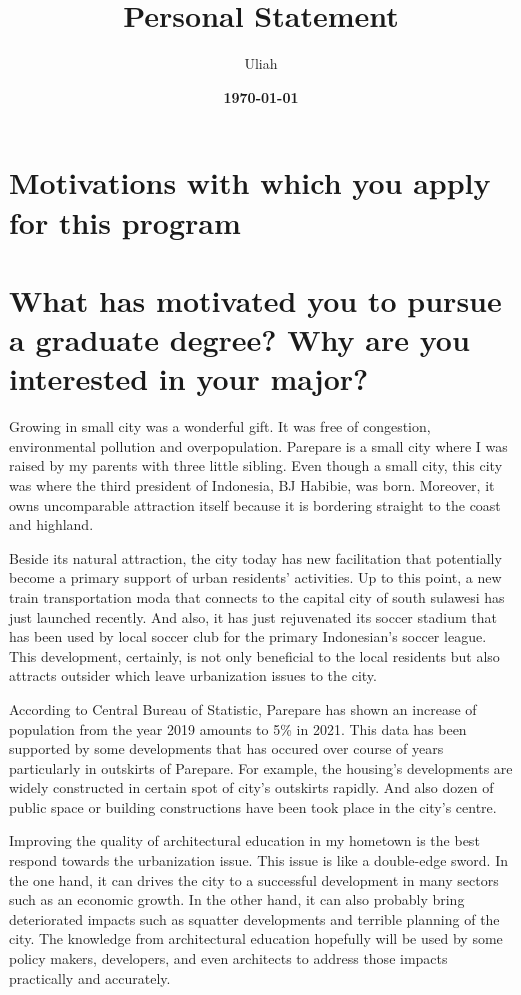 \documentclass[11pt]{simart} %
\title{
\textbf{Personal Statement} \\
} %
\date{\textbf{\today}}
\author{Uliah}
\begin{document}
\maketitle %

\section{Motivations with which you apply for this program}
\section*{What has motivated you to pursue a graduate degree? Why are you interested in your major?}

Growing in small city was a wonderful gift. It was free of congestion, environmental pollution and overpopulation. Parepare is a small city where I was raised by my parents with three little sibling. Even though a small city, this city was where the third president of Indonesia, BJ Habibie, was born.
Moreover, it owns uncomparable attraction itself because it is bordering straight to the coast and highland.

Beside its natural attraction, the city today has new facilitation that potentially become a primary support of urban residents' activities.
Up to this point, a new train transportation moda that connects to the capital city of south sulawesi has just launched recently.
And also, it has just rejuvenated its soccer stadium that has been used by local soccer club for the primary Indonesian's soccer league.
This development, certainly, is not only beneficial to the local residents but also attracts outsider which leave urbanization issues to the city.

According to Central Bureau of Statistic, Parepare has shown an increase of population from the year 2019 amounts to 5\% in 2021. This data has been supported by some developments that has occured over course of years particularly in outskirts of Parepare. For example, the housing's developments are widely constructed in certain spot of city's outskirts rapidly. And also dozen of public space or building constructions have been took place in the city's centre.

Improving the quality of architectural education in my hometown is the best respond towards the urbanization issue.
This issue is like a double-edge sword. In the one hand, it can drives the city to a successful development in many sectors such as an economic growth. In the other hand, it can also probably bring deteriorated impacts such as squatter developments and terrible planning of the city. The knowledge from architectural education hopefully will be used by some policy makers, developers, and even architects to address those impacts practically and accurately.
\end{document}
